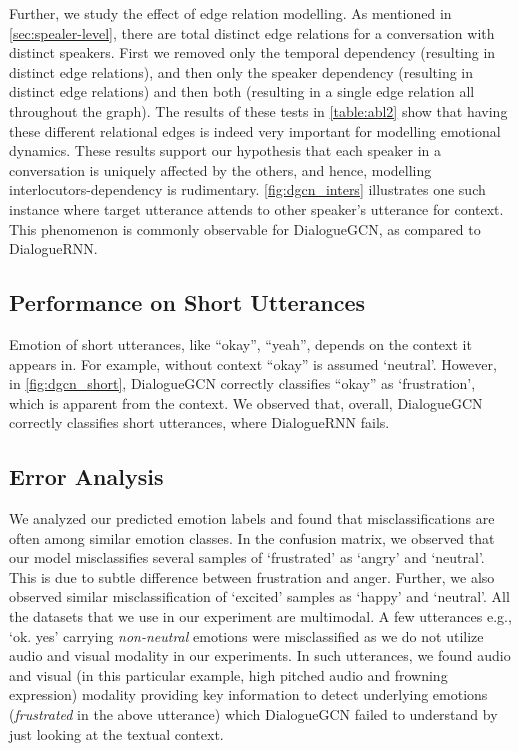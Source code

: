 \documentclass[11pt,a4paper]{article}
\begin{document}
Further, we study the effect of edge relation modelling. As mentioned in \cref{sec:spealer-level}, there are total  distinct edge relations 
for a conversation with  distinct speakers. First we removed only the temporal dependency (resulting in  distinct edge relations), and then only the speaker dependency (resulting in  distinct edge relations) and then both (resulting in a single edge relation all throughout the graph). The results of these tests in \cref{table:abl2} show that having these different relational edges is indeed very important for modelling emotional dynamics. These results support our hypothesis that each speaker in a conversation is uniquely affected by the others, and hence, modelling interlocutors-dependency is rudimentary. \cref{fig:dgcn_inters} illustrates one such instance where target utterance attends to other speaker's utterance for context. This phenomenon is commonly observable for DialogueGCN, as compared to DialogueRNN.

\subsection{Performance on Short Utterances}
Emotion of short utterances, like ``okay'', ``yeah'', depends on the context it appears in. For example, without context ``okay'' is assumed `neutral'. However, in \cref{fig:dgcn_short}, DialogueGCN correctly classifies ``okay'' as `frustration', which is apparent from the context. We observed that, overall, DialogueGCN correctly classifies short utterances, where DialogueRNN fails.



\subsection{Error Analysis}
We analyzed our predicted emotion labels and found that misclassifications are often among similar emotion classes. In the confusion matrix, we observed that our model misclassifies several samples of `frustrated' as `angry' and `neutral'. This is due to subtle difference between frustration and anger. Further, we also observed similar misclassification of `excited' samples as `happy' and `neutral'. All the datasets that we use in our experiment are multimodal. A few utterances e.g., `ok. yes' carrying \emph{non-neutral} emotions were misclassified as we do not utilize audio and visual modality in our experiments. In such utterances, we found audio and visual (in this particular example, high pitched audio and frowning expression) modality providing key information to detect underlying emotions (\emph{frustrated} in the above utterance) which DialogueGCN failed to understand by just looking at the textual context.
\end{document}
